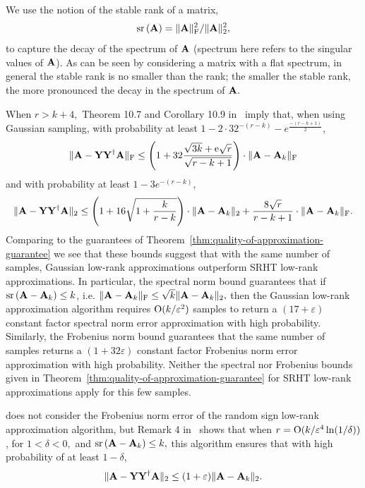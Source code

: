 We use the notion of the stable rank of a matrix,
$$
 \operatorname{sr}\left({\bm{\mathrm{A}}}\right) = \mbox{}\|{\bm{\mathrm{A}}}\|_\mathrm{F}^2/\mbox{}\|{\bm{\mathrm{A}}}\|_2^2,
$$
to capture the decay of the spectrum of ${\bm{\mathrm{A}}}$ (spectrum here refers to the singular values of ${\bm{\mathrm{A}}}$).
As can be seen by considering a matrix with a flat spectrum, in general the stable rank is no smaller than the rank; the smaller the stable rank, the more pronounced the decay in the spectrum of ${\bm{\mathrm{A}}}.$

When $r > k+4,$ Theorem 10.7 and Corollary 10.9 in~\cite{HMT} imply that, when using Gaussian sampling,
with probability at least $1 - 2 \cdot 32^{-(r-k)} - e^{\frac{-(r-k+1)}{2}}$,
\[
 \mbox{}\|{\bm{\mathrm{A}}} - {\bm{\mathrm{Y}}} {{\bm{\mathrm{Y}}}}^\dagger {\ensuremath{\bm{\mathrm{A}}}}\|_\mathrm{F} \leq \left( 1 + 32 { \sqrt{3 k} + {\mathrm e} \sqrt{r} \over \sqrt{r -k+1}}  \right) \cdot \mbox{}\|{\bm{\mathrm{A}}} - {\bm{\mathrm{A}}}_k\|_\mathrm{F}
\]
and with probability at least $1 - 3e^{-(r-k)}$,
\[
 \mbox{}\|{\bm{\mathrm{A}}} - {\bm{\mathrm{Y}}}{{\bm{\mathrm{Y}}}}^\dagger {\ensuremath{\bm{\mathrm{A}}}}\|_2 \leq \left(1 + 16\sqrt{1 + {k\over r-k}} \right) \cdot \mbox{}\|{\bm{\mathrm{A}}} - {\bm{\mathrm{A}}}_k\|_2 + {8\sqrt{r}\over r-k+1} \cdot \mbox{}\|{\bm{\mathrm{A}}} - {\bm{\mathrm{A}}}_k\|_\mathrm{F}.
\]
Comparing to the guarantees of Theorem~\ref{thm:quality-of-approximation-guarantee} we see that these bounds suggest that with the same number of samples, Gaussian low-rank approximations outperform SRHT low-rank approximations. In particular, the spectral norm bound guarantees that if $\operatorname{sr}\left({\bm{\mathrm{A}}} - {\bm{\mathrm{A}}}_k\right) \leq k$, i.e.
$ \mbox{}\|{\bm{\mathrm{A}}} - {\bm{\mathrm{A}}}_k\|_\mathrm{F} \le \sqrt{k} \mbox{}\|{\bm{\mathrm{A}}} - {\bm{\mathrm{A}}}_k\|_2,$
then the Gaussian low-rank approximation algorithm requires $\mathrm{O}(k/\varepsilon^2)$ samples to return a
$(17+\varepsilon)$ constant factor spectral norm error approximation with high probability. Similarly, the Frobenius norm bound guarantees that the same number of samples returns a $(1 + 32 \varepsilon)$ constant factor Frobenius norm error approximation with high probability. Neither the spectral nor Frobenius bounds given in Theorem~\ref{thm:quality-of-approximation-guarantee} for SRHT low-rank approximations apply for this few samples.

\cite{Zou10} does not consider the Frobenius norm error of the random sign low-rank approximation algorithm, but Remark 4 in~\cite{Zou10} shows that when
$r = \mathrm{O}(k/\varepsilon^4 \ln(1/\delta) )$, for $1 < \delta < 0,$ and $\operatorname{sr}\left({\bm{\mathrm{A}}} - {\bm{\mathrm{A}}}_k\right) \leq k,$ this algorithm ensures that with high probability of at least $1-\delta$,
\[
 \mbox{}\|{\bm{\mathrm{A}}} - {\bm{\mathrm{Y}}}{{\bm{\mathrm{Y}}}}^\dagger {\ensuremath{\bm{\mathrm{A}}}}\|_2 \leq (1 + \varepsilon) \mbox{}\|{\bm{\mathrm{A}}} - {\bm{\mathrm{A}}}_k\|_2.
\]

